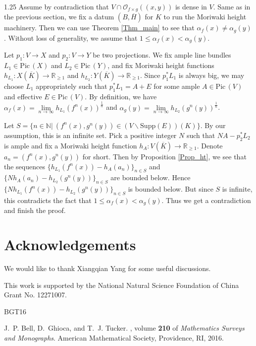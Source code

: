 \documentclass[12pt]{amsart}
\newcommand{\mb}[1]{\mathbb{#1}}
\newcommand\ra{\rightarrow}
\newcommand\Pic{\mathrm{Pic\,}}
\begin{document}
\begin{spacing}{1.25}
Assume by contradiction that $V\cap\mathcal{O}_{f\times g}((x,y))$ is dense in $V$. Same as in the previous section, we fix a datum $(B,\overline{H})$ for $K$ to run the Moriwaki height machinery. Then we can use Theorem \ref{Thm_main} to see that $\alpha_f(x)\neq\alpha_g(y)$. Without loss of generality, we assume that $1\leq\alpha_f(x)<\alpha_g(y)$. 

Let $p_1:V\ra X$ and $p_2:V\ra Y$ be two projections. We fix ample line bundles $L_1\in\Pic(X)$ and $L_2\in\Pic(Y)$, and fix Moriwaki height functions $h_{L_1}:X(\overline{K})\ra\mb{R}_{\geq1}$ and $h_{L_2}:Y(\overline{K})\ra\mb{R}_{\geq1}$. Since $p_1^*L_1$ is always big, we may choose $L_1$ appropriately such that $p_1^*L_1=A+E$ for some ample $A\in\Pic(V)$ and effective $E\in\Pic(V)$. By definition, we have $\alpha_f(x)=\lim\limits_{n\ra\infty}h_{L_1}(f^n(x))^{\frac{1}{n}}$ and $\alpha_g(y)=\lim\limits_{n\ra\infty}h_{L_2}(g^n(y))^{\frac{1}{n}}$.

Let $S=\{n\in\mathbb{N}|\ (f^n(x),g^n(y))\in(V\backslash\mathrm{Supp}(E))(K)\}$. By our assumption, this is an infinite set. Pick a positive integer $N$ such that $NA-p_2^*L_2$ is ample and fix a Moriwaki height function $h_A:V(\overline{K})\ra\mb{R}_{\geq1}$. Denote $a_n=(f^n(x),g^n(y))$ for short. Then by Proposition \ref{Prop_ht}, we see that the sequences $\{h_{L_1}(f^n(x))-h_A(a_n)\}_{n\in S}$ and $\{Nh_A(a_n)-h_{L_2}(g^n(y))\}_{n\in S}$ are bounded below. Hence $\{Nh_{L_1}(f^n(x))-h_{L_2}(g^n(y))\}_{n\in S}$ is bounded below. But since $S$ is infinite, this contradicts the fact that $1\leq\alpha_f(x)<\alpha_g(y)$. Thus we get a contradiction and finish the proof.
\endproof










\section*{Acknowledgements}
We would like to thank Xiangqian Yang for some useful discussions.

This work is supported by the National Natural Science Foundation of China Grant No. 12271007.



\begin{thebibliography}{BGT16}

J.~P. Bell, D.~Ghioca, and T.~J. Tucker.
, volume \textbf{210} of
  {\em Mathematics Surveys and Monographs}.
\newblock American Mathematical Society, Providence, RI, 2016.


\end{thebibliography}
\end{spacing}
\end{document}
